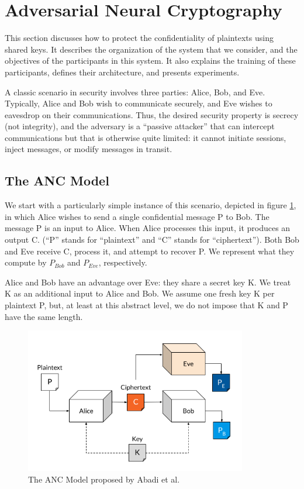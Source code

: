 \documentclass[a4paper]{article}
\begin{document}
  \section{Adversarial Neural Cryptography}
  This section discusses how to protect the confidentiality of plaintexts using shared keys. It describes
  the organization of the system that we consider, and the objectives of the participants in this system.
  It also explains the training of these participants, defines their architecture, and presents experiments.

  A classic scenario in security involves three parties: Alice, Bob, and Eve. Typically, Alice and Bob
  wish to communicate securely, and Eve wishes to eavesdrop on their communications. Thus, the
  desired security property is secrecy (not integrity), and the adversary is a “passive attacker” that
  can intercept communications but that is otherwise quite limited: it cannot initiate sessions, inject
  messages, or modify messages in transit.

    \subsection{The ANC Model}
    We start with a particularly simple instance of this scenario, 
    depicted in figure \ref{fig:anc}, in which Alice
    wishes to send a single confidential message P to Bob. The message P is an input to Alice. When
    Alice processes this input, it produces an output C. (“P” stands for “plaintext” and “C” stands for
    “ciphertext”). Both Bob and Eve receive C, process it, and attempt to recover P. We represent what
    they compute by $P_{Bob}$ and $P_{Eve}$, respectively. 
    
    Alice and Bob have an advantage over Eve: they share
    a secret key K\cite{seminalanc}. We treat K as an additional input to Alice and Bob. We assume one fresh key K per
    plaintext P, but, at least at this abstract level, we do not impose that K and P have the same length.
    
    \begin{figure}[H]
      \centering
      \includegraphics[height=2.5in]{../ref/anc.png}
      \caption{The ANC Model proposed by Abadi et al.}
      \label{fig:anc}
    \end{figure}    
    
\end{document}
